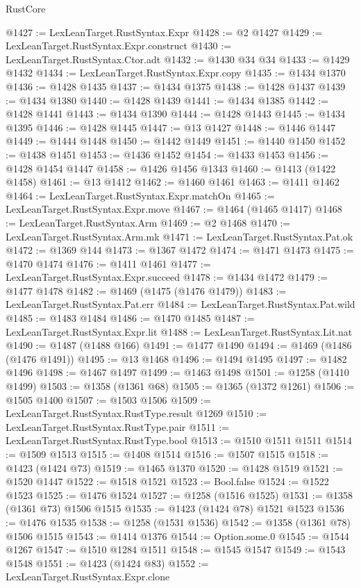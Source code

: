 \begin{lexlean}{RustCore}
\begin{coremodule}
@1427 := LexLeanTarget.RustSyntax.Expr
@1428 := @2 @1427
@1429 := LexLeanTarget.RustSyntax.Expr.construct
@1430 := LexLeanTarget.RustSyntax.Ctor.adt
@1432 := @1430 @34 @34
@1433 := @1429 @1432
@1434 := LexLeanTarget.RustSyntax.Expr.copy
@1435 := @1434 @1370
@1436 := @1428 @1435
@1437 := @1434 @1375
@1438 := @1428 @1437
@1439 := @1434 @1380
@1440 := @1428 @1439
@1441 := @1434 @1385
@1442 := @1428 @1441
@1443 := @1434 @1390
@1444 := @1428 @1443
@1445 := @1434 @1395
@1446 := @1428 @1445
@1447 := @13 @1427
@1448 := @1446 @1447
@1449 := @1444 @1448
@1450 := @1442 @1449
@1451 := @1440 @1450
@1452 := @1438 @1451
@1453 := @1436 @1452
@1454 := @1433 @1453
@1456 := @1428 @1454 @1447
@1458 := @1426 @1456 @1343
@1460 := @1413 (@1422 @1458)
@1461 := @13 @1412
@1462 := @1460 @1461
@1463 := @1411 @1462
@1464 := LexLeanTarget.RustSyntax.Expr.matchOn
@1465 := LexLeanTarget.RustSyntax.Expr.move
@1467 := @1464 (@1465 @1417)
@1468 := LexLeanTarget.RustSyntax.Arm
@1469 := @2 @1468
@1470 := LexLeanTarget.RustSyntax.Arm.mk
@1471 := LexLeanTarget.RustSyntax.Pat.ok
@1472 := @1369 @144
@1473 := @1367 @1472
@1474 := @1471 @1473
@1475 := @1470 @1474
@1476 := @1411 @1461
@1477 := LexLeanTarget.RustSyntax.Expr.succeed
@1478 := @1434 @1472
@1479 := @1477 @1478
@1482 := @1469 (@1475 (@1476 @1479))
@1483 := LexLeanTarget.RustSyntax.Pat.err
@1484 := LexLeanTarget.RustSyntax.Pat.wild
@1485 := @1483 @1484
@1486 := @1470 @1485
@1487 := LexLeanTarget.RustSyntax.Expr.lit
@1488 := LexLeanTarget.RustSyntax.Lit.nat
@1490 := @1487 (@1488 @166)
@1491 := @1477 @1490
@1494 := @1469 (@1486 (@1476 @1491))
@1495 := @13 @1468
@1496 := @1494 @1495
@1497 := @1482 @1496
@1498 := @1467 @1497
@1499 := @1463 @1498
@1501 := @1258 (@1410 @1499)
@1503 := @1358 (@1361 @68)
@1505 := @1365 (@1372 @1261)
@1506 := @1505 @1400
@1507 := @1503 @1506
@1509 := LexLeanTarget.RustSyntax.RustType.result @1269
@1510 := LexLeanTarget.RustSyntax.RustType.pair
@1511 := LexLeanTarget.RustSyntax.RustType.bool
@1513 := @1510 @1511 @1511
@1514 := @1509 @1513
@1515 := @1408 @1514
@1516 := @1507 @1515
@1518 := @1423 (@1424 @73)
@1519 := @1465 @1370
@1520 := @1428 @1519
@1521 := @1520 @1447
@1522 := @1518 @1521
@1523 := Bool.false
@1524 := @1522 @1523
@1525 := @1476 @1524
@1527 := @1258 (@1516 @1525)
@1531 := @1358 (@1361 @73) @1506 @1515
@1535 := @1423 (@1424 @78) @1521 @1523
@1536 := @1476 @1535
@1538 := @1258 (@1531 @1536)
@1542 := @1358 (@1361 @78) @1506 @1515
@1543 := @1414 @1376
@1544 := Option.some.{0}
@1545 := @1544 @1267
@1547 := @1510 @1284 @1511
@1548 := @1545 @1547
@1549 := @1543 @1548
@1551 := @1423 (@1424 @83)
@1552 := LexLeanTarget.RustSyntax.Expr.clone

\end{coremodule}
\end{lexlean}

